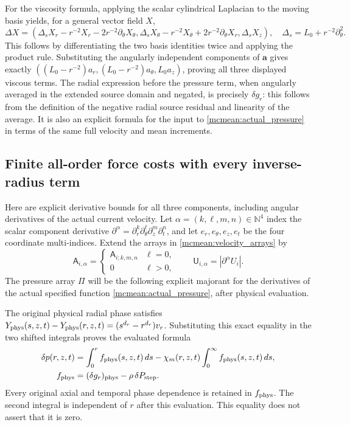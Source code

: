 For the viscosity formula, applying the scalar cylindrical Laplacian
to the moving basis yields, for a general vector field \(X\),
\[
 \Delta X=
 \left(\Delta_sX_r-r^{-2}X_r-2r^{-2}\partial_\theta X_\theta,
       \Delta_sX_\theta-r^{-2}X_\theta+2r^{-2}\partial_\theta X_r,
       \Delta_sX_z\right),
 \quad\Delta_s=L_0+r^{-2}\partial_\theta^2.
\]
This follows by differentiating the two basis identities twice and
applying the product rule. Substituting the angularly independent
components of \(\boldsymbol a\) gives exactly
\(((L_0-r^{-2})a_r,(L_0-r^{-2})a_\theta,L_0a_z)\), proving all
three displayed viscous terms.
The radial expression before the pressure term, when angularly
averaged in the extended source domain and negated, is precisely
\(\delta g_r\): this follows from the definition of the negative
radial source residual and linearity of the average. It is also an
explicit formula for the input to \eqref{mcmean:actual_pressure} in
terms of the same full velocity and mean increments.

\subsection{Finite all-order force costs with every inverse-radius term}

Here are explicit derivative bounds for all three components, including
angular derivatives of the actual current velocity. Let
\(\alpha=(k,\ell,m,n)\in\mathbb N^4\) index the scalar component
derivative \(\partial^\alpha=\partial_r^k\partial_\theta^\ell
\partial_z^m\partial_t^n\), and let
\(e_r,e_\theta,e_z,e_t\) be the four coordinate multi-indices.
Extend the arrays in \eqref{mcmean:velocity_arrays} by
\[
 \mathsf A_{i,\alpha}=
 \begin{cases}\mathsf A_{i;k,m,n}&\ell=0,\\0&\ell>0,
 \end{cases}
 \qquad
 \mathsf U_{i,\alpha}=|\partial^\alpha U_i|.
\]
The pressure array \(\mathsf\Pi\) will be the following explicit
majorant for the derivatives of the actual specified function
\eqref{mcmean:actual_pressure}, after physical evaluation.

The original physical radial phase satisfies
\(Y_{\rm phys}(s,z,t)-Y_{\rm phys}(r,z,t)
=(s^{d_r}-r^{d_r})v_r\). Substituting this exact equality in the
two shifted integrals proves the evaluated formula
\begin{equation}\label{mcmean:evaluated_pressure}
\begin{split}
 \delta p(r,z,t)
 &=\int_0^r f_{\rm phys}(s,z,t)\,ds
        -\chi_m(r,z,t)\int_0^\infty f_{\rm phys}(s,z,t)\,ds,\\
 f_{\rm phys}&=(\delta g_r)_{\rm phys}
                       -\rho\,\delta P_{\rm step}.
\end{split}
\end{equation}
Every original axial and temporal phase dependence is retained in
\(f_{\rm phys}\). The second integral is independent of \(r\)
after this evaluation. This equality does not assert that it is zero.

